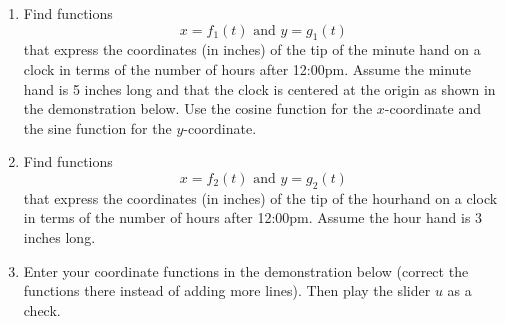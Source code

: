 \documentclass{ximera}
\begin{document}
\begin{question} \label{Qgpnd0:Motiondfdsfeee}
\begin{enumerate}
\item Find functions
\[
   x = f_1(t) \text{ and } y=g_1(t)
\]
that express the coordinates (in inches) of the tip of the minute hand on a clock in terms of the number of hours after 12:00pm. Assume the minute hand is 5 inches long and that the clock is centered at the origin as shown in the demonstration below. Use the cosine function for the $x$-coordinate and the sine function for the $y$-coordinate.

\item Find functions
\[
   x = f_2(t) \text{ and } y=g_2(t)
\]
that express the coordinates (in inches) of the tip of the hourhand on a clock in terms of the number of hours after 12:00pm. Assume the hour hand is 3 inches long.

\item Enter your coordinate functions in the demonstration below (correct the functions there instead of adding more lines). Then play the slider $u$ as a check.


 
\begin{onlineOnly}
    \begin{center}
\end{center}
\end{onlineOnly}

\end{enumerate}

\end{question}
\end{document}
